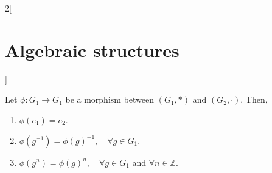 \documentclass[class=article,10pt,crop=false]{standalone}
\begin{document}
\begin{multicols}{2}[\section{Algebraic structures}]
\begin{definition}
\end{definition}
\begin{lemma}
Let $\phi:G_1\rightarrow G_1$ be a morphism between $(G_1,*)$ and $(G_2,\cdot)$. Then,
\begin{enumerate}
    \item $\phi(e_1)=e_2$.
    \item $\phi(g^{-1})=\phi(g)^{-1},\quad\forall g\in G_1$.
    \item $\phi(g^n)=\phi(g)^n,\quad\forall g\in G_1$ and $\forall n\in\mathbb{Z}$.
\end{enumerate}
\end{lemma}
\end{multicols}
\end{document}
